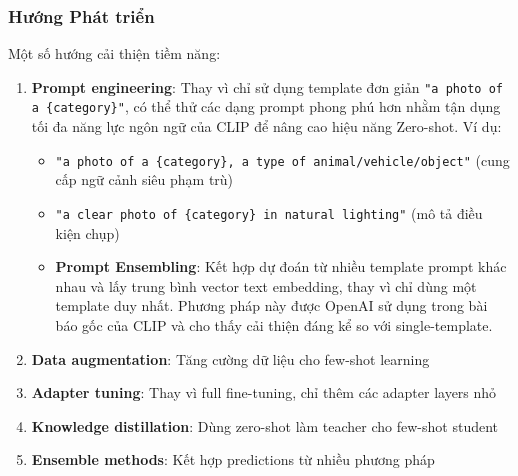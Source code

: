 \subsubsection{Hướng Phát triển}
Một số hướng cải thiện tiềm năng:
\begin{enumerate}
    \item \textbf{Prompt engineering}: Thay vì chỉ sử dụng template đơn giản \texttt{"a photo of a \{category\}"}, có thể thử các dạng prompt phong phú hơn nhằm tận dụng tối đa năng lực ngôn ngữ của CLIP để nâng cao hiệu năng Zero-shot. Ví dụ:
    \begin{itemize}
        \item \texttt{"a photo of a \{category\}, a type of animal/vehicle/object"} (cung cấp ngữ cảnh siêu phạm trù)
        \item \texttt{"a clear photo of \{category\} in natural lighting"} (mô tả điều kiện chụp)
        \item \textbf{Prompt Ensembling}: Kết hợp dự đoán từ nhiều template prompt khác nhau và lấy trung bình vector text embedding, thay vì chỉ dùng một template duy nhất. Phương pháp này được OpenAI sử dụng trong bài báo gốc của CLIP và cho thấy cải thiện đáng kể so với single-template.
    \end{itemize}
    \item \textbf{Data augmentation}: Tăng cường dữ liệu cho few-shot learning
    \item \textbf{Adapter tuning}: Thay vì full fine-tuning, chỉ thêm các adapter layers nhỏ
    \item \textbf{Knowledge distillation}: Dùng zero-shot làm teacher cho few-shot student
    \item \textbf{Ensemble methods}: Kết hợp predictions từ nhiều phương pháp
\end{enumerate}
